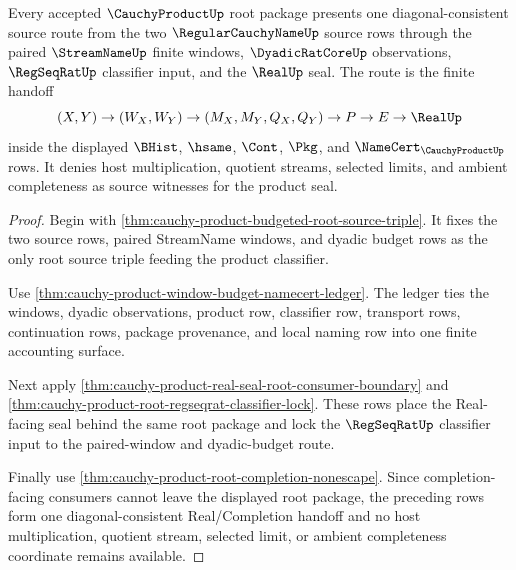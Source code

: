 \begin{theorem}
\label{thm:cauchy-product-root-source-diagonal-consistency}
Every accepted $\CauchyProductUp$ root package presents one diagonal-consistent source route from the two $\RegularCauchyNameUp$ source rows through the paired $\StreamNameUp$ finite windows, $\DyadicRatCoreUp$ observations, $\RegSeqRatUp$ classifier input, and the $\RealUp$ seal. The route is the finite handoff
$$
(X,Y)\to(W_X,W_Y)\to(M_X,M_Y,Q_X,Q_Y)\to P\to E\to \RealUp
$$
inside the displayed $\BHist$, $\hsame$, $\Cont$, $\Pkg$, and $\NameCert_{\CauchyProductUp}$ rows. It denies host multiplication, quotient streams, selected limits, and ambient completeness as source witnesses for the product seal.
\end{theorem}
\begin{proof}
Begin with \autoref{thm:cauchy-product-budgeted-root-source-triple}. It fixes the two source rows, paired StreamName windows, and dyadic budget rows as the only root source triple feeding the product classifier.

Use \autoref{thm:cauchy-product-window-budget-namecert-ledger}. The ledger ties the windows, dyadic observations, product row, classifier row, transport rows, continuation rows, package provenance, and local naming row into one finite accounting surface.

Next apply \autoref{thm:cauchy-product-real-seal-root-consumer-boundary} and \autoref{thm:cauchy-product-root-regseqrat-classifier-lock}. These rows place the Real-facing seal behind the same root package and lock the $\RegSeqRatUp$ classifier input to the paired-window and dyadic-budget route.

Finally use \autoref{thm:cauchy-product-root-completion-nonescape}. Since completion-facing consumers cannot leave the displayed root package, the preceding rows form one diagonal-consistent Real/Completion handoff and no host multiplication, quotient stream, selected limit, or ambient completeness coordinate remains available.
\end{proof}

